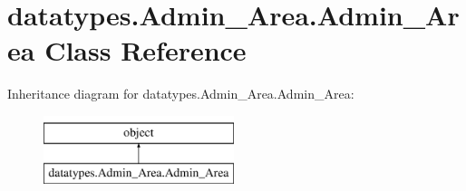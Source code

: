 \hypertarget{classdatatypes_1_1Admin__Area_1_1Admin__Area}{}\section{datatypes.\+Admin\+\_\+\+Area.\+Admin\+\_\+\+Area Class Reference}
\label{classdatatypes_1_1Admin__Area_1_1Admin__Area}
Inheritance diagram for datatypes.\+Admin\+\_\+\+Area.\+Admin\+\_\+\+Area\+:\begin{figure}[H]
\begin{center}
\leavevmode
\includegraphics[height=2.000000cm]{classdatatypes_1_1Admin__Area_1_1Admin__Area}
\end{center}
\end{figure}
